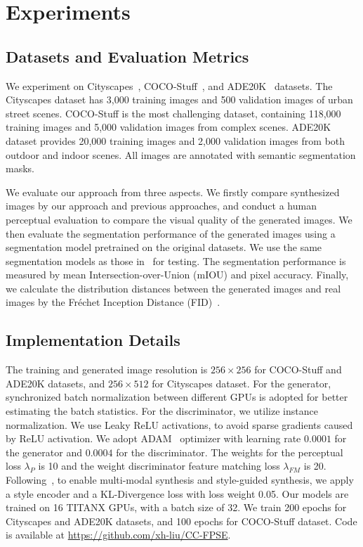 \documentclass{article}
\begin{document}
\section{Experiments}



\subsection{Datasets and Evaluation Metrics}
We experiment on Cityscapes~\cite{cordts2016cityscapes}, COCO-Stuff~\cite{caesar2018coco}, and ADE20K~\cite{zhou2017scene} datasets.
The Cityscapes dataset has 3,000 training images and 500 validation images of urban street scenes.
COCO-Stuff is the most challenging dataset, containing 118,000 training images and 5,000 validation images from complex scenes.
ADE20K dataset provides 20,000 training images and 2,000 validation images from both outdoor and indoor scenes.
All images are annotated with semantic segmentation masks.

We evaluate our approach from three aspects.
We firstly compare synthesized images by our approach and previous approaches, and conduct a human perceptual evaluation to compare the visual quality of the generated images.
We then evaluate the segmentation performance of the generated images using a segmentation model pretrained on the original datasets.
We use the same segmentation models as those in~\cite{park2019semantic} for testing. The segmentation performance is measured by mean Intersection-over-Union (mIOU) and pixel accuracy.
Finally, we calculate the distribution distances between the generated images and real images by the Fr\'echet Inception Distance (FID)~\cite{heusel2017gans}.


\subsection{Implementation Details}
The training and generated image resolution is $256\times 256$ for COCO-Stuff and ADE20K datasets, and $256\times 512$ for Cityscapes dataset.
For the generator, synchronized batch normalization between different GPUs is adopted for better estimating the batch statistics.
For the discriminator, we utilize instance normalization.
We use Leaky ReLU activations, to avoid sparse gradients caused by ReLU activation.
We adopt ADAM~\cite{kingma2014adam} optimizer with learning rate $0.0001$ for the generator and $0.0004$ for the discriminator.
The weights for the perceptual loss $\lambda_P$ is 10 and the weight discriminator feature matching loss $\lambda_{FM}$ is 20.
Following~\cite{park2019semantic}, to enable multi-modal synthesis and style-guided synthesis, we apply a style encoder and a KL-Divergence loss with loss weight 0.05.
Our models are trained on 16 TITANX GPUs, with a batch size of 32.
We train 200 epochs for Cityscapes and ADE20K datasets, and 100 epochs for COCO-Stuff dataset.
Code is available at \href{https://github.com/xh-liu/CC-FPSE}{https://github.com/xh-liu/CC-FPSE}.
\end{document}
